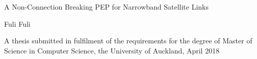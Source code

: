 \thispagestyle{empty}
\begin{center}
\vspace*{3cm}
{\Huge\baselineskip=1.5cm
A Non-Connection Breaking PEP for Narrowband Satellite Links}\\
\mbox{}\par %
\vspace*{1cm}
{\huge Fuli Fuli}\par %
\vspace{7cm}

{\Large A thesis submitted in fulfilment of the requirements
for the degree of Master of Science in Computer Science,
the University of Auckland, April 2018}
\end{center}
